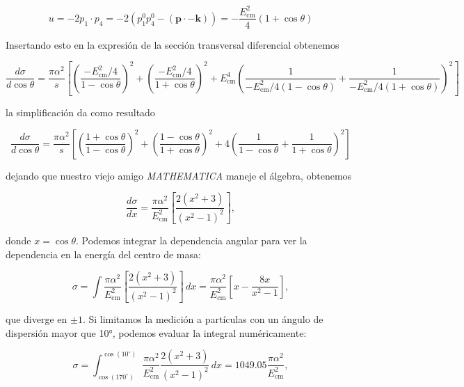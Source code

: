 \begin{equation}
u = -2p_1 \cdot p_4 = -2(p_1^0 p_4^0 - (\mathbf{p} \cdot -\mathbf{k}))
= -\frac{E_{\text{cm}}^2}{4} (1 + \cos \theta)
\end{equation}

Insertando esto en la expresión de la sección transversal diferencial obtenemos

\begin{equation}
\frac{d\sigma}{d\cos \theta} = \frac{\pi \alpha^2}{s} \left[ \left( \frac{-E_{\text{cm}}^2/4}{1 - \cos \theta} \right)^2 + \left( \frac{-E_{\text{cm}}^2/4}{1 + \cos \theta} \right)^2
+ E_{\text{cm}}^4 \left( \frac{1}{-E_{\text{cm}}^2/4 (1 - \cos \theta)} + \frac{1}{-E_{\text{cm}}^2/4 (1 + \cos \theta)} \right)^2 \right]
\end{equation}

la simplificación da como resultado

\begin{equation}
\frac{d\sigma}{d\cos \theta} = \frac{\pi \alpha^2}{s} \left[ \left( \frac{1 + \cos \theta}{1 - \cos \theta}\right)^2 + \left( \frac{1 - \cos \theta}{1 + \cos \theta} \right)^2 + 4 \left( \frac{1}{1 - \cos \theta} + \frac{1}{1 + \cos \theta} \right)^2 \right]
\end{equation}

dejando que nuestro viejo amigo \textsl{MATHEMATICA} maneje el álgebra, obtenemos

\begin{equation}
\frac{d\sigma}{dx} = \frac{\pi \alpha^2}{E_{\text{cm}}^2} \left[ \frac{2 (x^2 + 3)}{(x^2 - 1)^2} \right],
\end{equation}

donde $x = \cos \theta$. Podemos integrar la dependencia angular para ver la dependencia en la energía del centro de masa:

\begin{equation}
\sigma = \int \frac{\pi \alpha^2}{E_{\text{cm}}^2} \left[ \frac{2 (x^2 + 3)}{(x^2 - 1)^2} \right] \, dx = \frac{\pi \alpha^2}{E_{\text{cm}}^2} \left[ x - \frac{8x}{x^2 - 1} \right],
\end{equation}

que diverge en $\pm 1$. Si limitamos la medición a partículas con un ángulo de dispersión mayor que 10°, podemos evaluar la integral numéricamente:

\begin{equation}
\sigma = \int_{\cos(170^\circ)}^{\cos(10^\circ)} \frac{\pi \alpha^2}{E_{\text{cm}}^2} \frac{2 (x^2 + 3)}{(x^2 - 1)^2} \, dx = 1049.05 \frac{\pi \alpha^2}{E_{\text{cm}}^2},
\end{equation}

